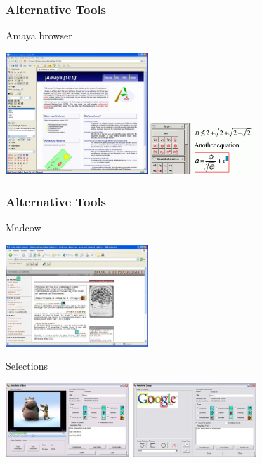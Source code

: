 \begin{frame}
	\frametitle{Alternative Tools}
	\begin{block}{Amaya browser}
		\begin{center}
			\includegraphics[width=0.4\textwidth]{./images/amaya.jpg}\hspace{0.1cm}
			\includegraphics[width=0.3\textwidth]{./images/highlight3.png}
		\end{center}
	\end{block}
\end{frame}
\begin{frame}
	\frametitle{Alternative Tools}
	\begin{block}{Madcow}
		\begin{center}
			\includegraphics[width=0.4\textwidth]{./images/madcow3.png}
		\end{center}
	\end{block}
	\begin{block}{Selections}
		\begin{center}
			\includegraphics[width=0.35\textwidth]{./images/madcow1.png}\hspace{0.1cm}
			\includegraphics[width=0.35\textwidth]{./images/madcow2.png}
		\end{center}
	\end{block}
\end{frame}
